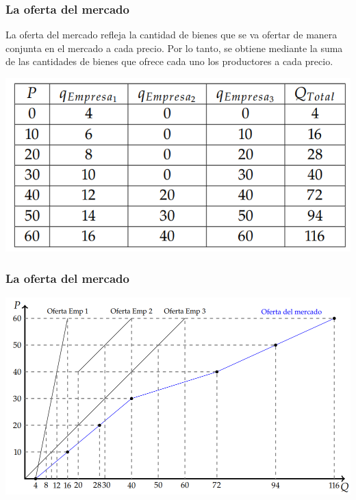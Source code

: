 \documentclass{beamer}
\begin{document}
\begin{frame}
    \frametitle{La oferta del mercado}
    \begin{boxA}
        \centering
        La oferta del mercado refleja la cantidad de bienes que se va ofertar de manera conjunta en el mercado a cada precio. Por lo tanto, se obtiene mediante la suma de las cantidades de bienes que ofrece cada uno los productores a cada precio.
    \end{boxA}
    \centering
    \includegraphics[scale=0.6]{../Figures/T14.1.png}
\end{frame}

\begin{frame}
    \frametitle{La oferta del mercado}
    \centering
    \includegraphics[scale=0.5]{../Figures/C14.1.png}
\end{frame}
\end{document}
